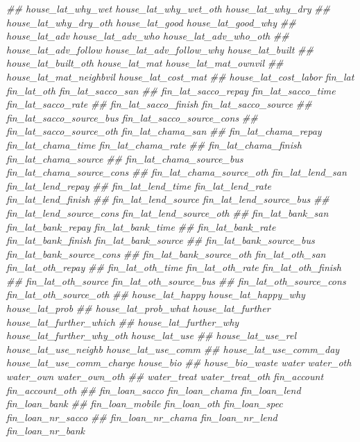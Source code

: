 \documentclass[
]{article}
\newenvironment{Shaded}{\begin{snugshade}}{\end{snugshade}}
\newcommand{\CommentTok}[1]{\textcolor[rgb]{0.56,0.35,0.01}{\textit{#1}}}
\begin{document}
\begin{Shaded}
\begin{Highlighting}[]
\CommentTok{##      house_lat_why_wet house_lat_why_wet_oth house_lat_why_dry}
\CommentTok{##      house_lat_why_dry_oth house_lat_good house_lat_good_why}
\CommentTok{##      house_lat_adv house_lat_adv_who house_lat_adv_who_oth}
\CommentTok{##      house_lat_adv_follow house_lat_adv_follow_why house_lat_built}
\CommentTok{##      house_lat_built_oth house_lat_mat house_lat_mat_ownvil}
\CommentTok{##      house_lat_mat_neighbvil house_lat_cost_mat}
\CommentTok{##      house_lat_cost_labor fin_lat fin_lat_oth fin_lat_sacco_san}
\CommentTok{##      fin_lat_sacco_repay fin_lat_sacco_time fin_lat_sacco_rate}
\CommentTok{##      fin_lat_sacco_finish fin_lat_sacco_source}
\CommentTok{##      fin_lat_sacco_source_bus fin_lat_sacco_source_cons}
\CommentTok{##      fin_lat_sacco_source_oth fin_lat_chama_san}
\CommentTok{##      fin_lat_chama_repay fin_lat_chama_time fin_lat_chama_rate}
\CommentTok{##      fin_lat_chama_finish fin_lat_chama_source}
\CommentTok{##      fin_lat_chama_source_bus fin_lat_chama_source_cons}
\CommentTok{##      fin_lat_chama_source_oth fin_lat_lend_san fin_lat_lend_repay}
\CommentTok{##      fin_lat_lend_time fin_lat_lend_rate fin_lat_lend_finish}
\CommentTok{##      fin_lat_lend_source fin_lat_lend_source_bus}
\CommentTok{##      fin_lat_lend_source_cons fin_lat_lend_source_oth}
\CommentTok{##      fin_lat_bank_san fin_lat_bank_repay fin_lat_bank_time}
\CommentTok{##      fin_lat_bank_rate fin_lat_bank_finish fin_lat_bank_source}
\CommentTok{##      fin_lat_bank_source_bus fin_lat_bank_source_cons}
\CommentTok{##      fin_lat_bank_source_oth fin_lat_oth_san fin_lat_oth_repay}
\CommentTok{##      fin_lat_oth_time fin_lat_oth_rate fin_lat_oth_finish}
\CommentTok{##      fin_lat_oth_source fin_lat_oth_source_bus}
\CommentTok{##      fin_lat_oth_source_cons fin_lat_oth_source_oth}
\CommentTok{##      house_lat_happy house_lat_happy_why house_lat_prob}
\CommentTok{##      house_lat_prob_what house_lat_further house_lat_further_which}
\CommentTok{##      house_lat_further_why house_lat_further_why_oth house_lat_use}
\CommentTok{##      house_lat_use_rel house_lat_use_neighb house_lat_use_comm}
\CommentTok{##      house_lat_use_comm_day house_lat_use_comm_charge house_bio}
\CommentTok{##      house_bio_waste water water_oth water_own water_own_oth}
\CommentTok{##      water_treat water_treat_oth fin_account fin_account_oth}
\CommentTok{##      fin_loan_sacco fin_loan_chama fin_loan_lend fin_loan_bank}
\CommentTok{##      fin_loan_mobile fin_loan_oth fin_loan_spec fin_loan_nr_sacco}
\CommentTok{##      fin_loan_nr_chama fin_loan_nr_lend fin_loan_nr_bank}

\end{Highlighting}
\end{Shaded}
\end{document}

